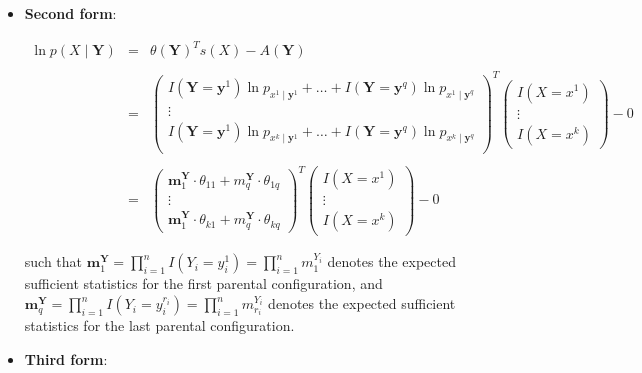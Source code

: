 \documentclass[11pt, oneside]{article}   	%
\numberwithin{figure}{section}
\numberwithin{equation}{section}
\numberwithin{table}{section}
\theoremstyle{definition}
\begin{document}
\begin{appendices}
\begin{itemize}
\vspace{0.5in}
\item \textbf{Second form}:

\begin{eqnarray*}
\ln p(X \mid \mathbf{Y}) &=& \theta(\mathbf{Y})^Ts(X) - A(\mathbf{Y}) \\ \\
&=&
\begin{pmatrix}
I(\mathbf{Y}=\mathbf{y}^1) \ln p_{x^1\mid \mathbf{y}^1} + \ldots + I(\mathbf{Y}=\mathbf{y}^q)\ln p_{x^1\mid \mathbf{y}^q}\\
\vdots \\
I(\mathbf{Y}=\mathbf{y}^1) \ln p_{x^k\mid \mathbf{y}^1} + \ldots + I(\mathbf{Y}=\mathbf{y}^q)\ln p_{x^k\mid \mathbf{y}^q}\\
\end{pmatrix}^T
\begin{pmatrix}
I(X=x^1) \\
\vdots \\
I(X=x^k) 
\end{pmatrix}
- 0 \\ \\
&=&
\begin{pmatrix}
\mathbf{m}^{\mathbf{Y}}_1 \cdot \theta_{11}  + m^{\mathbf{Y}}_q \cdot \theta_{1q} \\
\vdots \\
\mathbf{m}^{\mathbf{Y}}_1 \cdot \theta_{k1}  + m^{\mathbf{Y}}_q \cdot \theta_{kq}
\end{pmatrix}^T
\begin{pmatrix}
I(X=x^1) \\
\vdots \\
I(X=x^k)
\end{pmatrix}
- 0 
\end{eqnarray*}

\noindent such that $\mathbf{m}^{\mathbf{Y}}_1 = \prod_{i=1}^n I( Y_i = y_i^1) = \prod_{i=1}^n m^{Y_i}_1$ denotes the expected sufficient statistics for the first parental configuration, and $\mathbf{m}^{\mathbf{Y}}_q = \prod_{i=1}^n I( Y_i = y_i^{r_i})  = \prod_{i=1}^n m^{Y_i}_{r_i} $ denotes the expected sufficient statistics for the last parental configuration.

\vspace{0.5in}
\item \textbf{Third form}:


\end{itemize}
\end{appendices}
\end{document}
